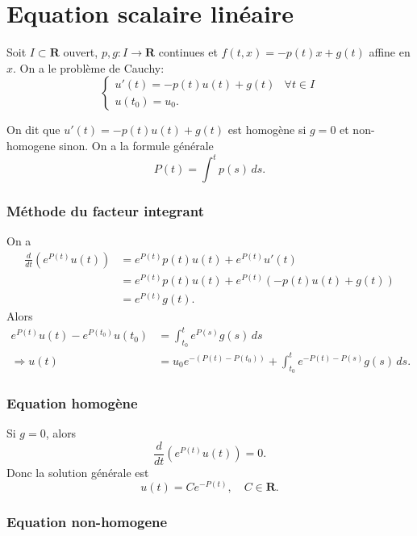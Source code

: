 \section{Equation scalaire linéaire}

Soit $I\subset \mathbf{R}$ ouvert, $p,g:I\to \mathbf{R}$ continues et $f(t,x)=-p(t)x+g(t)$ affine en $x$. On a le problème de Cauchy:
$$
\begin{cases}
u'(t) =-p(t)u(t)+g(t) & \forall t\in I  \\
u(t_{0})=u_{0}.
\end{cases}
$$

On dit que $u'(t)=-p(t)u(t)+g(t)$ est homogène si $g=0$ et non-homogene sinon. On a la formule générale
$$
P(t)=\int ^{t}p(s)\,ds.
$$
\subsubsection*{Méthode du facteur integrant}

On a 
\begin{align*}
\frac{d}{dt} (e^{P(t)}u(t)) & =e^{ P(t) }p(t)u(t)+e^{ P(t)}u'(t) \\
 & =e^{ P(t) }p(t)u(t)+e^{ P(t) }(-p(t)u(t)+g(t)) \\
 & =e^{ P(t) }g(t).
\end{align*}
Alors
\begin{align*}
e^{ P(t) }u(t) -e^{ P(t_{0}) }u(t_{0}) & =\int_{t_{0}}^{t} e^{ P(s) }g(s) \, ds \\
\Rightarrow u(t) & =u_{0}e^{ -(P(t)-P(t_{0})) }+\int_{t_{0}}^{t} e^{ -P(t)-P(s) }g(s) \, ds. 
\end{align*}
\subsubsection{Equation homogène}

Si $g=0$, alors
$$
\frac{d}{dt} (e^{ P(t) }u(t))=0.
$$
Donc la solution générale est
$$
u(t)=Ce^{ -P(t) },\quad C\in \mathbf{R}.
$$

\subsubsection{Equation non-homogene}

